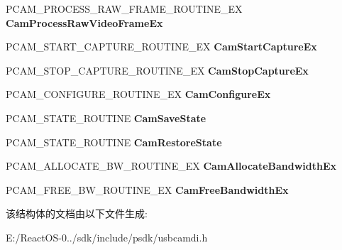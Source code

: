 \begin{DoxyCompactItemize}
P\+C\+A\+M\+\_\+\+P\+R\+O\+C\+E\+S\+S\+\_\+\+R\+A\+W\+\_\+\+F\+R\+A\+M\+E\+\_\+\+R\+O\+U\+T\+I\+N\+E\+\_\+\+EX {\bfseries Cam\+Process\+Raw\+Video\+Frame\+Ex}
\item 
\mbox{\label{struct___u_s_b_c_a_m_d___d_e_v_i_c_e___d_a_t_a2_a9453cdd79e2d4c022a89eba35d527023}} 
P\+C\+A\+M\+\_\+\+S\+T\+A\+R\+T\+\_\+\+C\+A\+P\+T\+U\+R\+E\+\_\+\+R\+O\+U\+T\+I\+N\+E\+\_\+\+EX {\bfseries Cam\+Start\+Capture\+Ex}
\item 
\mbox{\label{struct___u_s_b_c_a_m_d___d_e_v_i_c_e___d_a_t_a2_a8f0bf7889984377f84ec10e25a8bc87b}} 
P\+C\+A\+M\+\_\+\+S\+T\+O\+P\+\_\+\+C\+A\+P\+T\+U\+R\+E\+\_\+\+R\+O\+U\+T\+I\+N\+E\+\_\+\+EX {\bfseries Cam\+Stop\+Capture\+Ex}
\item 
\mbox{\label{struct___u_s_b_c_a_m_d___d_e_v_i_c_e___d_a_t_a2_a630abce814e28d0e71de5280c775594e}} 
P\+C\+A\+M\+\_\+\+C\+O\+N\+F\+I\+G\+U\+R\+E\+\_\+\+R\+O\+U\+T\+I\+N\+E\+\_\+\+EX {\bfseries Cam\+Configure\+Ex}
\item 
\mbox{\label{struct___u_s_b_c_a_m_d___d_e_v_i_c_e___d_a_t_a2_aa053546ca390984be5b8e8d0b39038c3}} 
P\+C\+A\+M\+\_\+\+S\+T\+A\+T\+E\+\_\+\+R\+O\+U\+T\+I\+NE {\bfseries Cam\+Save\+State}
\item 
\mbox{\label{struct___u_s_b_c_a_m_d___d_e_v_i_c_e___d_a_t_a2_a81200bc6dac05f59b452b3d7b3c2a03d}} 
P\+C\+A\+M\+\_\+\+S\+T\+A\+T\+E\+\_\+\+R\+O\+U\+T\+I\+NE {\bfseries Cam\+Restore\+State}
\item 
\mbox{\label{struct___u_s_b_c_a_m_d___d_e_v_i_c_e___d_a_t_a2_aa618427d27be35e52075849125d4d2d8}} 
P\+C\+A\+M\+\_\+\+A\+L\+L\+O\+C\+A\+T\+E\+\_\+\+B\+W\+\_\+\+R\+O\+U\+T\+I\+N\+E\+\_\+\+EX {\bfseries Cam\+Allocate\+Bandwidth\+Ex}
\item 
\mbox{\label{struct___u_s_b_c_a_m_d___d_e_v_i_c_e___d_a_t_a2_ac4e3f95a0d1eb0734760f5c63469b8de}} 
P\+C\+A\+M\+\_\+\+F\+R\+E\+E\+\_\+\+B\+W\+\_\+\+R\+O\+U\+T\+I\+N\+E\+\_\+\+EX {\bfseries Cam\+Free\+Bandwidth\+Ex}
\end{DoxyCompactItemize}


该结构体的文档由以下文件生成\+:\begin{DoxyCompactItemize}
\item 
E\+:/\+React\+O\+S-\/0../sdk/include/psdk/usbcamdi.\+h\end{DoxyCompactItemize}
